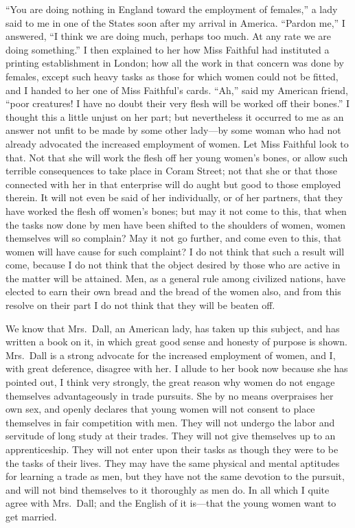 ``You are doing nothing in England toward the employment of
females,'' a lady said to me in one of the States soon after my
arrival in America.  ``Pardon me,'' I answered, ``I think we are doing
much, perhaps too much.  At any rate we are doing something.''  I
then explained to her how Miss Faithful had instituted a printing
establishment in London; how all the work in that concern was done
by females, except such heavy tasks as those for which women could
not be fitted, and I handed to her one of Miss Faithful's cards.
``Ah,'' said my American friend, ``poor creatures!  I have no doubt
their very flesh will be worked off their bones.''  I thought this a
little unjust on her part; but nevertheless it occurred to me as an
answer not unfit to be made by some other lady---by some woman who
had not already advocated the increased employment of women.  Let
Miss Faithful look to that.  Not that she will work the flesh off
her young women's bones, or allow such terrible consequences to
take place in Coram Street; not that she or that those connected
with her in that enterprise will do aught but good to those
employed therein.  It will not even be said of her individually, or
of her partners, that they have worked the flesh off women's bones;
but may it not come to this, that when the tasks now done by men
have been shifted to the shoulders of women, women themselves will
so complain?  May it not go further, and come even to this, that
women will have cause for such complaint?  I do not think that such
a result will come, because I do not think that the object desired
by those who are active in the matter will be attained.  Men, as a
general rule among civilized nations, have elected to earn their
own bread and the bread of the women also, and from this resolve on
their part I do not think that they will be beaten off.

We know that Mrs.\ Dall, an American lady, has taken up this
subject, and has written a book on it, in which great good sense
and honesty of purpose is shown.  Mrs.\ Dall is a strong advocate
for the increased employment of women, and I, with great deference,
disagree with her.  I allude to her book now because she has
pointed out, I think very strongly, the great reason why women do
not engage themselves advantageously in trade pursuits.  She by no
means overpraises her own sex, and openly declares that young women
will not consent to place themselves in fair competition with men.
They will not undergo the labor and servitude of long study at
their trades.  They will not give themselves up to an
apprenticeship.  They will not enter upon their tasks as though
they were to be the tasks of their lives.  They may have the same
physical and mental aptitudes for learning a trade as men, but they
have not the same devotion to the pursuit, and will not bind
themselves to it thoroughly as men do.  In all which I quite agree
with Mrs.\ Dall; and the English of it is---that the young women want
to get married.

